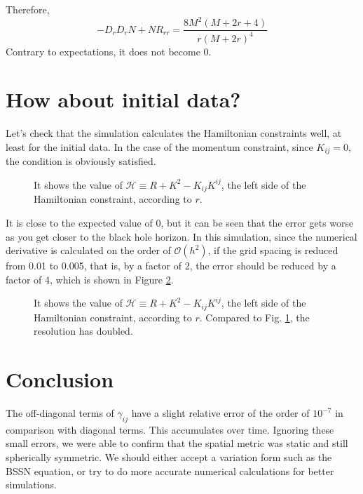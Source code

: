 Therefore,
\begin{equation}
	-D_rD_rN + NR_{rr} = \frac{8 M^{2} \left(M + 2 r + 4\right)}{r \left(M + 2 r\right)^{4}}
\end{equation}
Contrary to expectations, it does not become 0.

\section{How about initial data?}
Let's check that the simulation calculates the Hamiltonian constraints well, at least for the initial data. In the case of the momentum constraint, since $K_{ij} = 0$, the condition is obviously satisfied.
\begin{figure}[H]
	\centering
	
	\caption{It shows the value of $\mathcal{H}\equiv R+K^2-K_{ij}K^{ij}$, the left side of the Hamiltonian constraint, according to $r$.}
	\label{fig:hamil_err}
\end{figure}
It is close to the expected value of 0, but it can be seen that the error gets worse as you get closer to the black hole horizon. In this simulation, since the numerical derivative is calculated on the order of $\mathcal{O}(h^2)$, if the grid spacing is reduced from 0.01 to 0.005, that is, by a factor of 2, the error should be reduced by a factor of 4, which is shown in Figure \ref{fig:hamil_err1}.

\begin{figure}[H]
	\centering
	
	\caption{It shows the value of $\mathcal{H}\equiv R+K^2-K_{ij}K^{ij}$, the left side of the Hamiltonian constraint, according to $r$. Compared to Fig. \ref{fig:hamil_err}, the resolution has doubled.}
	\label{fig:hamil_err1}
\end{figure}

\section{Conclusion}



The off-diagonal terms of $\gamma_{ij}$ have a slight relative error of the order of $10^{-7}$ in comparison with diagonal terms. This accumulates over time. Ignoring these small errors, we were able to confirm that the spatial metric was static and still spherically symmetric. We should either accept a variation form such as the BSSN equation, or try to do more accurate numerical calculations for better simulations.
